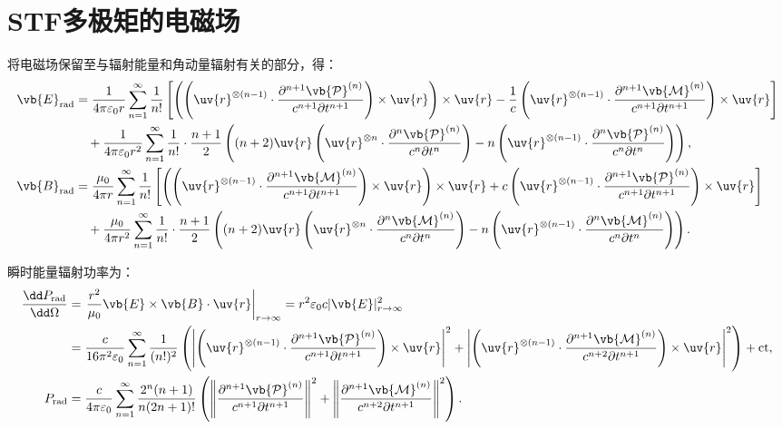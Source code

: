 \section{STF多极矩的电磁场}

将电磁场保留至与辐射能量和角动量辐射有关的部分，得：
\begin{align*}
	\vb{E}_{\text{rad}} &= \frac{1}{4\pi \varepsilon_0 r} \sum_{n=1}^{\infty} \frac{1}{n!} \left[ \left( \left( \uv{r}^{\otimes (n-1)} \cdot \frac{\partial^{n+1} \vb{\mathcal{P}}^{(n)}}{c^{n+1} \partial t^{n+1}} \right) \times \uv{r} \right) \times \uv{r} - \frac{1}{c} \left( \uv{r}^{\otimes (n-1)} \cdot \frac{\partial^{n+1} \vb{\mathcal{M}}^{(n)}}{c^{n+1} \partial t^{n+1}} \right) \times \uv{r} \right] \\
	&\quad + \frac{1}{4\pi \varepsilon_0 r^2} \sum_{n=1}^{\infty} \frac{1}{n!} \cdot \frac{n+1}{2} \left( (n+2) \uv{r} \left( \uv{r}^{\otimes n} \cdot \frac{\partial^n \vb{\mathcal{P}}^{(n)}}{c^n \partial t^n} \right) - n \left( \uv{r}^{\otimes (n-1)} \cdot \frac{\partial^n \vb{\mathcal{P}}^{(n)}}{c^n \partial t^n} \right) \right), \\
	\vb{B}_{\text{rad}} &= \frac{\mu_0}{4\pi r} \sum_{n=1}^{\infty} \frac{1}{n!} \left[ \left( \left( \uv{r}^{\otimes (n-1)} \cdot \frac{\partial^{n+1} \vb{\mathcal{M}}^{(n)}}{c^{n+1} \partial t^{n+1}} \right) \times \uv{r} \right) \times \uv{r} + c \left( \uv{r}^{\otimes (n-1)} \cdot \frac{\partial^{n+1} \vb{\mathcal{P}}^{(n)}}{c^{n+1} \partial t^{n+1}} \right) \times \uv{r} \right] \\
	&\quad + \frac{\mu_0}{4\pi r^2} \sum_{n=1}^{\infty} \frac{1}{n!} \cdot \frac{n+1}{2} \left( (n+2) \uv{r} \left( \uv{r}^{\otimes n} \cdot \frac{\partial^n \vb{\mathcal{M}}^{(n)}}{c^n \partial t^n} \right) - n \left( \uv{r}^{\otimes (n-1)} \cdot \frac{\partial^n \vb{\mathcal{M}}^{(n)}}{c^n \partial t^n} \right) \right).
\end{align*}

瞬时能量辐射功率为：
\small
\begin{align*}
	\frac{\dd  P_{\text{rad}}}{\dd \Omega} &= \left. \frac{r^2}{\mu_0} \vb{E} \times \vb{B} \cdot \uv{r} \right|_{r \to \infty} = r^2 \varepsilon_0 c |\vb{E}|^2_{r \to \infty} \\
	&= \frac{c}{16\pi^2 \varepsilon_0} \sum_{n=1}^{\infty} \frac{1}{(n!)^2} \left( \left| \left( \uv{r}^{\otimes (n-1)} \cdot \frac{\partial^{n+1} \vb{\mathcal{P}}^{(n)}}{c^{n+1} \partial t^{n+1}} \right) \times \uv{r} \right|^2 + \left| \left( \uv{r}^{\otimes (n-1)} \cdot \frac{\partial^{n+1} \vb{\mathcal{M}}^{(n)}}{c^{n+2} \partial t^{n+1}} \right) \times \uv{r} \right|^2 \right) + \text{ct}, \\
	P_{\text{rad}} &= \frac{c}{4\pi \varepsilon_0} \sum_{n=1}^{\infty} \frac{2^n (n+1)}{n (2n+1)!} \left( \left\| \frac{\partial^{n+1} \vb{\mathcal{P}}^{(n)}}{c^{n+1} \partial t^{n+1}} \right\|^2 + \left\| \frac{\partial^{n+1} \vb{\mathcal{M}}^{(n)}}{c^{n+2} \partial t^{n+1}} \right\|^2 \right).
\end{align*}
\normalsize

